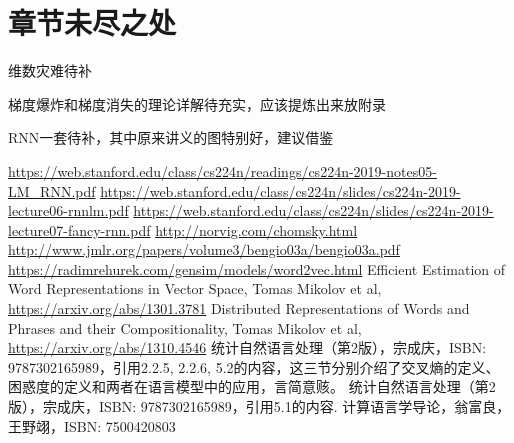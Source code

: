 
\section*{章节未尽之处}

维数灾难待补

梯度爆炸和梯度消失的理论详解待充实，应该提炼出来放附录

RNN一套待补，其中原来讲义的图特别好，建议借鉴

\begin{thebibliography}{本章节参考文献\&阅读材料}
 \url{https://web.stanford.edu/class/cs224n/readings/cs224n-2019-notes05-LM_RNN.pdf}
 \url{https://web.stanford.edu/class/cs224n/slides/cs224n-2019-lecture06-rnnlm.pdf}
 \url{https://web.stanford.edu/class/cs224n/slides/cs224n-2019-lecture07-fancy-rnn.pdf}
 \url{http://norvig.com/chomsky.html}
 \url{http://www.jmlr.org/papers/volume3/bengio03a/bengio03a.pdf}
 \url{https://radimrehurek.com/gensim/models/word2vec.html}
 Efficient Estimation of Word Representations in Vector Space, Tomas Mikolov et al, \url{https://arxiv.org/abs/1301.3781}
 Distributed Representations of Words and Phrases and their Compositionality, Tomas Mikolov et al, \url{https://arxiv.org/abs/1310.4546}
 统计自然语言处理（第2版），宗成庆，ISBN: 9787302165989，引用2.2.5, 2.2.6, 5.2的内容，这三节分别介绍了交叉熵的定义、困惑度的定义和两者在语言模型中的应用，言简意赅。
 统计自然语言处理（第2版），宗成庆，ISBN: 9787302165989，引用5.1的内容.
 计算语言学导论，翁富良，王野翊，ISBN: 7500420803
\end{thebibliography}


